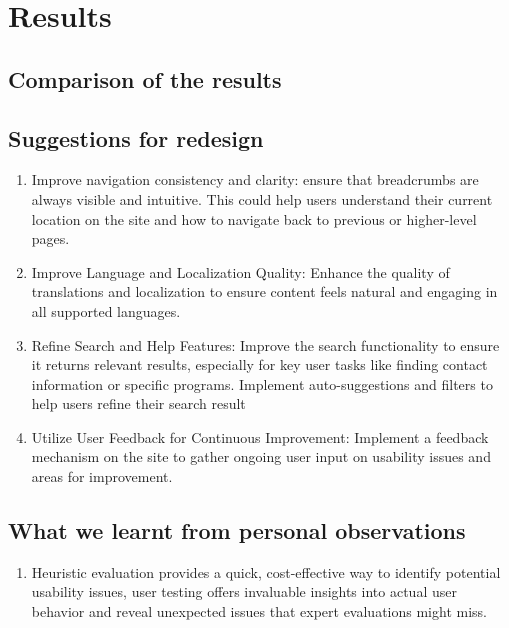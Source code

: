 \section*{Results}

\subsection{Comparison of the results}

\subsection{Suggestions for redesign}
\begin{enumerate}
	\item Improve navigation consistency and clarity: ensure that breadcrumbs are always visible and intuitive. This could help users understand their current location on the site and how to navigate back to previous or higher-level pages.
	
	\item Improve Language and Localization Quality: Enhance the quality of translations and localization to ensure content feels natural and engaging in all supported languages. 
	
	\item Refine Search and Help Features: Improve the search functionality to ensure it returns relevant results, especially for key user tasks like finding contact information or specific programs. Implement auto-suggestions and filters to help users refine their search result
	
	\item Utilize User Feedback for Continuous Improvement: Implement a feedback mechanism on the site to gather ongoing user input on usability issues and areas for improvement.
\end{enumerate}

\subsection{What we learnt from personal observations}
\begin{enumerate}
	\item Heuristic evaluation provides a quick, cost-effective way to identify potential usability issues, user testing offers invaluable insights into actual user behavior and reveal unexpected issues that expert evaluations might miss.
\end{enumerate}
